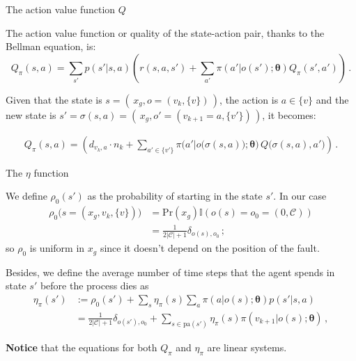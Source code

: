 \documentclass[10pt, aspectratio=169, compress, protectframetitle, handout]{beamer}
\begin{document}
\begin{frame}{The action value function $Q$}
    
    The \alert{action value function} or \alert{quality} of the state-action pair, thanks to the Bellman equation, is:
    \begin{equation*}
        Q_\pi(s,a) = \sum_{s'} p(s' | s,a) \left(r(s,a,s') + \sum_{a'} \pi(a'|o(s'); \boldsymbol \theta) Q_\pi(s',a') \right) \, .
    \end{equation*}
    
    Given that the state is $s = ( \, x_g, o = (v_k, \{v\}) \, )$, the action is $a \in \{v\}$ and the new state is $s' = \sigma(s,a) = ( \, x_g, o' = (v_{k+1}=a, \{v'\}) \, )$, it becomes:

    \begin{align*}
            Q_\pi(s,a) = \left(d_{v_k, a} \cdot n_{k} + \sum_{a' \in \{v'\}} \pi \Big( a' \big| o \big( \sigma(s,a) \big); \boldsymbol \theta \Big) \, Q \big( \sigma(s,a), a' \big) \right) \,.
    \end{align*}
    
\end{frame}

\begin{frame}{The $\eta$ function}

    We define $\rho_0(s')$ as the probability of starting in the state $s'$. In our case
    \begin{align*}
            \rho_0 \Big(s = ( x_g, v_k, \{v\}) \Big)
            &= \text{Pr}(x_g) \mathbb I(o(s) = o_0 = (0, \mathcal C)) \\
            &= \frac1{2|\mathcal C| + 1} \delta_{o(s), o_0} \, ;
    \end{align*}
    so $\rho_0$ is uniform in $x_g$ since it doesn't depend on the position of the fault.
    
    Besides, we define the average number of time steps that the agent spends in state $s'$ before the process dies as
    \begin{align*}
            \eta_\pi(s') &:= \rho_0(s') + \sum_s \eta_\pi(s) \sum_a \pi(a | o(s); \boldsymbol \theta) p(s' | s, a) \\
            &= \frac{1}{2|\mathcal C|+1} \delta_{o(s'), o_0} + \sum_{s \in \mathrm{pa}(s')} \eta_\pi(s) \pi(v_{k+1} | o(s); \boldsymbol \theta) \, ,
    \end{align*}
    
    \textbf{Notice} that the equations for both $Q_\pi$ and $\eta_\pi$ are \alert{linear systems}.

\end{frame}
\end{document}
